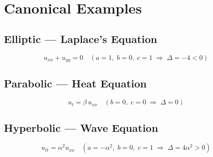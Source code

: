\section{Canonical Examples}

\subsection{Elliptic — Laplace's Equation}
\[
  u_{xx} + u_{yy} = 0 \quad (a=1,\; b=0,\; c=1 \;\Rightarrow\; \Delta = -4 < 0)
\]

\subsection{Parabolic — Heat Equation}
\[
  u_t = \beta\,u_{xx} \quad (b=0,\; c=0 \;\Rightarrow\; \Delta = 0)
\]

\subsection{Hyperbolic — Wave Equation}
\[
  u_{tt} = \alpha^2 u_{xx} \quad (a=-\alpha^2,\; b=0,\; c=1 \;\Rightarrow\; \Delta = 4\alpha^2 > 0)
\]
